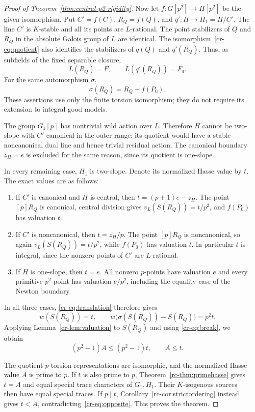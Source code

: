 \begin{proof}[Proof of Theorem~\ref{thm:central-p2-rigidity}]
Now let $f:G[p^2]\to H[p^2]$ be the given isomorphism. Put
$C'=f(C)$, $R_Q=f(Q)$, and $q':H\to H_1=H/C'$. The line $C'$ is
$K$-stable and all its points are $L$-rational. The point stabilizers of
$Q$ and $R_Q$ in the absolute Galois group of $L$ are identical. The
isomorphism~\eqref{cr-eq:quotient} also identifies the stabilizers of
$q(Q)$ and $q'(R_Q)$. Thus, as subfields of the fixed separable closure,
\begin{equation}\label{cr-eq:transport}
 L(R_Q)=F,\qquad L(q'(R_Q))=F_0.
\end{equation}
For the same automorphism $\sigma$,
\begin{equation}\label{cr-eq:translation}
 \sigma(R_Q)=R_Q+f(P_0).
\end{equation}
These assertions use only the finite torsion isomorphism; they do not
require its extension to integral good models.

The group $G_1[p]$ has nontrivial wild action over $L$. Therefore $H$ cannot
be two-slope with $C'$ canonical in the outer range: its quotient would
have a stable noncanonical dual line and hence trivial residual action.
The canonical boundary $z_H=e$ is excluded for the same reason, since its
quotient is one-slope.

In every remaining case, $H_1$ is two-slope. Denote its normalized Hasse
value by $t$. The exact values are as follows:
\begin{enumerate}
\item If $C'$ is canonical and $H$ is central, then
      $t=(p+1)e-z_H$. The point $[p]R_Q$ is canonical, central division
      gives $v_L(S(R_Q))=t/p^2$, and $f(P_0)$ has valuation $t$.
\item If $C'$ is noncanonical, then $t=z_H/p$.
      The point $[p]R_Q$ is noncanonical, so again
      $v_L(S(R_Q))=t/p^2$, while $f(P_0)$ has valuation $t$.
      In particular $t$ is integral, since the nonzero points of $C'$
      are $L$-rational.
\item If $H$ is one-slope, then $t=e$. All nonzero $p$-points have
      valuation $e$ and every primitive $p^2$-point has valuation
      $e/p^2$, including the equality case of the Newton boundary.
\end{enumerate}
In all three cases, \eqref{cr-eq:translation} therefore gives
\[
 w(S(R_Q))=t,\qquad
 w\bigl(\sigma(S(R_Q))-S(R_Q)\bigr)=p^2t.
\]
Applying Lemma~\ref{cr-lem:valuation} to $S(R_Q)$ and using
\eqref{cr-eq:break}, we obtain
\begin{equation}\label{cr-eq:opposite}
 (p^2-1)A\leq(p^2-1)t,\qquad A\leq t.
\end{equation}

The quotient $p$-torsion representations are isomorphic, and the
normalized Hasse value $A$ is prime to $p$. If $t$ is also prime to $p$,
Theorem~\ref{rc-thm:primehasse} gives $t=A$ and equal special
trace characters of $G_1,H_1$. Their $K$-isogenous sources then have equal
special traces. If $p\mid t$, Corollary~\ref{rc-cor:strictordering} instead
gives $t<A$, contradicting~\eqref{cr-eq:opposite}. This proves the
theorem.
\end{proof}


